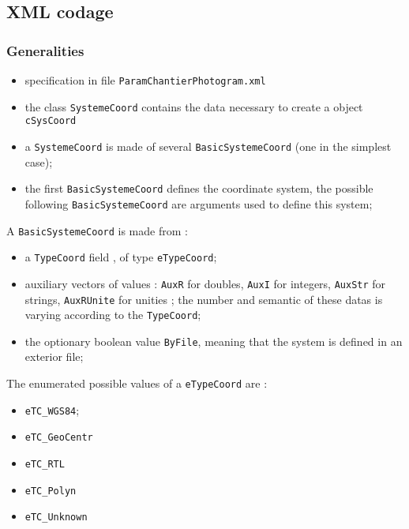 
\subsection{XML codage}



\subsubsection{Generalities}

\begin{itemize}
   \item specification in file {\tt ParamChantierPhotogram.xml}
   \item the class {\tt SystemeCoord} contains the data necessary to create a \CPP object {\tt cSysCoord}
   \item  a {\tt SystemeCoord} is made of several {\tt BasicSystemeCoord} (one in the simplest case);

   \item the first  {\tt BasicSystemeCoord} defines the coordinate system, the possible following
          {\tt BasicSystemeCoord} are arguments used to define this system;
\end{itemize}

A  {\tt BasicSystemeCoord}  is made from :

\begin{itemize}
   \item  a {\tt TypeCoord}  field , of type {\tt eTypeCoord};
   \item auxiliary vectors of values : {\tt AuxR} for doubles, {\tt AuxI} for integers,
         {\tt AuxStr} for strings, {\tt AuxRUnite} for unities ; the  number and semantic of these datas is
         varying according  to  the  {\tt TypeCoord};

    \item the optionary boolean value {\tt ByFile}, meaning that the system is defined in an exterior file;

\end{itemize}

The enumerated possible values of a {\tt eTypeCoord} are :

\begin{itemize}
   \item  {\tt eTC\_WGS84};
   \item  {\tt eTC\_GeoCentr}
   \item  {\tt eTC\_RTL}
   \item  {\tt eTC\_Polyn}
   \item  {\tt eTC\_Unknown}
\end{itemize}

